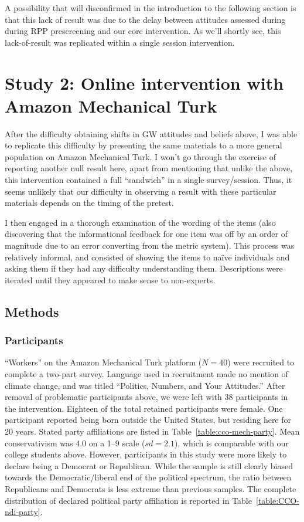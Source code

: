 A possibility that will disconfirmed in the introduction to the following
section is that this lack of result was due to the delay between attitudes
assessed during during RPP prescreening and our core intervention. As we'll
shortly see, this lack-of-result was replicated within a single session
intervention.

\section{Study 2: Online intervention with Amazon Mechanical Turk}
\label{sec:pro-mturk}

After the difficulty obtaining shifts in GW attitudes and beliefs above, I was
able to replicate this difficulty by presenting the same materials to a more
general population on Amazon Mechanical Turk. I won't go through the
exercise of reporting another null result here, apart from mentioning that
unlike the above, this intervention contained a full “sandwich” in a single
survey/session. Thus, it seems unlikely that our difficulty in observing a
result with these particular materials depends on the timing of the pretest.

I then engaged in a thorough examination of the wording of the items (also
discovering that the informational feedback for one item was off by an order of
magnitude due to an error converting from the metric system).  This process was
relatively informal, and consisted of showing the items to naïve individuals and
asking them if they had any difficulty understanding them.  Descriptions were
iterated until they appeared to make sense to non-experts.

\subsection{Methods}

\subsubsection{Participants}
\label{sec:CCO-ndi-participants}

“Workers” on the Amazon Mechanical Turk platform ($N=40$) were recruited to
complete a two-part survey. Language used in recruitment made no mention of
climate change, and was titled “Politics, Numbers, and Your Attitudes.” After
removal of problematic participants above, we were left with 38 participants in
the intervention. Eighteen of the total retained participants were female. One
participant reported being born outside the United States, but residing here for
20 years. Stated party affiliations are listed in
Table~\ref{table:cco-mech-party}. Mean conservativism was 4.0 on a 1--9 scale
($sd=2.1$), which is comparable with our college students above. However,
participants in this study were more likely to declare being a Democrat or
Republican.  While the sample is still clearly biased towards the
Democratic/liberal end of the political spectrum, the ratio between Republicans
and Democrats is less extreme than previous samples. The complete distribution
of declared political party affiliation is reported in
Table~\ref{table:CCO-ndi-party}.

